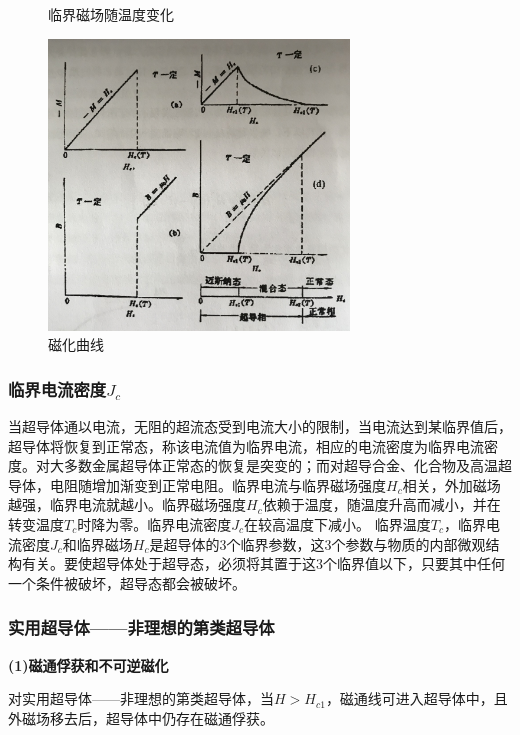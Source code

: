 \documentclass[UTF8]{ctexart}
\begin{document}
\begin{multicols}{2}
\begin{figure}[H]
  \caption{临界磁场随温度变化} 
  \label{fig:subfig} %
\end{figure}
\begin{figure}[H]
\centering
\includegraphics[width=8cm]{6.jpg}
\caption{\small{磁化曲线}}
\end{figure}

\subsubsection{临界电流密度$J_{c}$}
当超导体通以电流，无阻的超流态受到电流大小的限制，当电流达到某临界值后，超导体将恢复到正常态，称该电流值为临界电流，相应的电流密度为临界电流密度。对大多数金属超导体正常态的恢复是突变的；而对超导合金、化合物及高温超导体，电阻随增加渐变到正常电阻。临界电流与临界磁场强度$H_{c}$相关，外加磁场越强，临界电流就越小。临界磁场强度$H_{c}$依赖于温度，随温度升高而减小，并在转变温度$T_{c}$时降为零。临界电流密度$J_{c}$在较高温度下减小。
临界温度$T_{c}$，临界电流密度$J_{c}$和临界磁场$H_{c}$是超导体的3个临界参数，这3个参数与物质的内部微观结构有关。要使超导体处于超导态，必须将其置于这3个临界值以下，只要其中任何一个条件被破坏，超导态都会被破坏。
\subsubsection{实用超导体——非理想的第\uppercase\expandafter{}类超导体}
\noindent\textbf{(1)磁通俘获和不可逆磁化}

对实用超导体——非理想的第\uppercase\expandafter{}类超导体，当$H>H_{c1}$，磁通线可进入超导体中，且外磁场移去后，超导体中仍存在磁通俘获。


\end{multicols}
\end{document}
